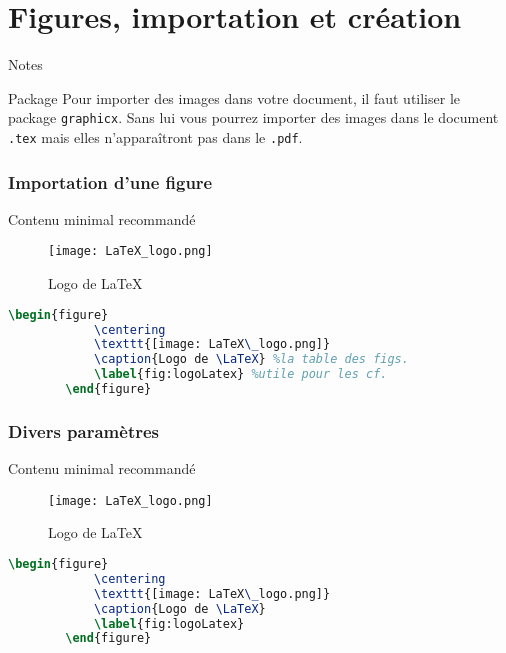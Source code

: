 \section{Figures, importation et création}

\begin{frame}{Notes}
    \begin{alertblock}{Package}
        Pour importer des images dans votre document, il faut utiliser le package \texttt{graphicx}.
        Sans lui vous pourrez importer des images dans le document \texttt{.tex} mais elles n'apparaîtront pas dans le \texttt{.pdf}.
    \end{alertblock}
\end{frame}

\begin{frame}[containsverbatim]
    \frametitle{Importation d'une figure}
    \begin{exampleblock}{Contenu minimal recommandé}
        \begin{figure}
            \centering
            \texttt{[image: LaTeX\_logo.png]}
            \caption{Logo de \LaTeX}
            \label{fig:logoLatex}
        \end{figure}
    \end{exampleblock}
    \begin{lstlisting}[language=TeX]
        \begin{figure}
            \centering
            \texttt{[image: LaTeX\_logo.png]}
            \caption{Logo de \LaTeX} %la table des figs.
            \label{fig:logoLatex} %utile pour les cf.
        \end{figure}
    \end{lstlisting}
\end{frame}

\begin{frame}[containsverbatim]
    \frametitle{Divers paramètres}
    \begin{exampleblock}{Contenu minimal recommandé}
        \begin{figure}
            \centering
            \texttt{[image: LaTeX\_logo.png]}
            \caption{Logo de \LaTeX}
        \end{figure}
    \end{exampleblock}
    \begin{lstlisting}[language=TeX]
        \begin{figure}
            \centering
            \texttt{[image: LaTeX\_logo.png]}
            \caption{Logo de \LaTeX}
            \label{fig:logoLatex}
        \end{figure}
    \end{lstlisting}
\end{frame}


